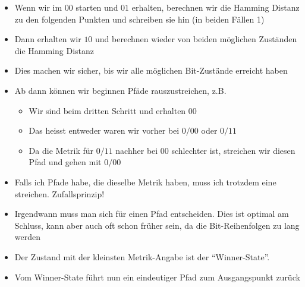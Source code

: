 \begin{itemize}
\tightlist
\item
  Wenn wir im $00$ starten und $01$ erhalten, berechnen wir die Hamming
  Distanz zu den folgenden Punkten und schreiben sie hin (in beiden
  Fällen 1)
\item
  Dann erhalten wir $10$ und berechnen wieder von beiden möglichen
  Zuständen die Hamming Distanz
\item
  Dies machen wir sicher, bis wir alle möglichen Bit-Zustände erreicht
  haben
\item
  Ab dann können wir beginnen Pfäde rauszustreichen, z.B.

  \begin{itemize}
  \tightlist
  \item
    Wir sind beim dritten Schritt und erhalten $00$
  \item
    Das heisst entweder waren wir vorher bei $0/00$ oder $0/11$
  \item
    Da die Metrik für $0/11$ nachher bei $00$ schlechter ist, streichen wir
    diesen Pfad und gehen mit $0/00$
  \end{itemize}
\item
  Falls ich Pfade habe, die dieselbe Metrik haben, muss ich trotzdem
  eine streichen. Zufallsprinzip!
\item
  Irgendwann muss man sich für einen Pfad entscheiden. Dies ist optimal
  am Schluss, kann aber auch oft schon früher sein, da die
  Bit-Reihenfolgen zu lang werden
\item
  Der Zustand mit der kleinsten Metrik-Angabe ist der ``Winner-State''.
\item
  Vom Winner-State führt nun ein eindeutiger Pfad zum Ausgangspunkt
  zurück
\end{itemize}

\clearpage

